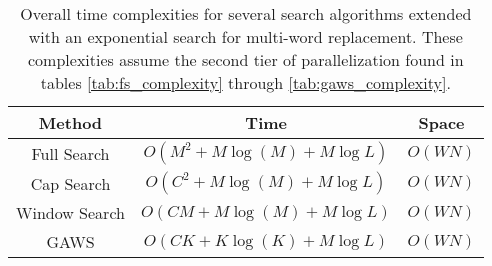 \begin{table}
\centering
\begin{tabular}{ |c|c|c| } 
 \hline
 Method & Time & Space \\ \hline
 Full Search & $O(M^2 + M\log(M) + M\log L)$ & $O(WN)$ \\ \hline 
 Cap Search & $O(C^2 + M\log(M) + M\log L)$ & $O(WN)$ \\ \hline 
 Window Search & $O(CM + M\log(M) + M\log L)$ & $O(WN)$ \\ \hline 
 GAWS & $O(CK + K\log(K) + M\log L)$ & $O(WN)$ \\ \hline 
\end{tabular}
\caption{Overall time complexities for several search algorithms extended with an exponential search for multi-word replacement.  These complexities assume the second tier of parallelization found in tables \ref{tab:fs_complexity} through \ref{tab:gaws_complexity}.}
\label{tab:overall_complexity}
\end{table}
